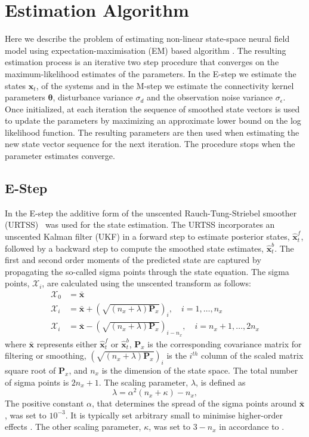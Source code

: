 \documentclass[]{article}
\begin{document}
\section{Estimation Algorithm}
Here we describe the problem of estimating non-linear state-space neural field model using expectation-maximisation (EM) based algorithm \cite{Shumway2000}. The resulting estimation process is an iterative two step procedure that converges on the maximum-likelihood estimates of the parameters. In the E-step we estimate the states $\mathbf x_t$, of the systems and in the M-step we estimate the connectivity kernel parameters $\boldsymbol \theta$, disturbance variance $\sigma_d$ and the observation noise variance $\sigma_{\epsilon}$. Once initialized, at each iteration the sequence of smoothed state vectors is used to update the parameters by maximizing an approximate lower bound on the log likelihood function. The resulting parameters are then used when estimating the new
state vector sequence for the next iteration. The procedure stops when the parameter estimates converge.
\subsection{E-Step}
In the E-step the additive form of the unscented Rauch-Tung-Striebel smoother (URTSS)~\cite{Sarkka2010} was used for the state estimation. The URTSS incorporates an unscented Kalman filter (UKF) \cite{Julier1997, Merwe2003} in a forward step to estimate posterior states, $\hat{\mathbf x}_t^{f}$, followed by a backward step to compute the smoothed state estimates, $\hat{\mathbf x}_t^{b}$. The first and second order moments of the predicted state are captured by propagating the so-called sigma points through the state equation. The sigma points, $\mathcal X_i$, are calculated using the unscented transform as follows:
\begin{align}\label{eq:sigmapoints1}
	\mathcal X_{0}&=\mathbf{\bar x} \\
	\mathcal X_{i}&= \mathbf{\bar x}+\left(\sqrt{( n_x + \lambda)\mathbf P_x}\right)_i, \quad i=1, \dots, n_x \\
	\mathcal X_{i}&=\mathbf{\bar x}-\left(\sqrt{( n_x + \lambda)\mathbf P_x}\right)_{i- n_x}, \quad i= n_x+1, \dots, 2n_x 
\end{align}
where $\mathbf{\bar x}$ represents either $\hat{\mathbf x}_t^{f}$ or $\hat{\mathbf x}_t^{b}$, $\mathbf{P}_x$ is the corresponding covariance matrix for filtering or smoothing, $\left(\sqrt{( n_x + \lambda)\mathbf P_x}\right)_i$ is the $i^{th}$ column of the scaled matrix square root of $\mathbf P_x$, and $n_x$ is the dimension of the state space. The total number of sigma points is $2n_x+1$. The scaling parameter, $\lambda$, is defined as 
\begin{equation}\label{eq:sigmapoints3}
	\lambda=\alpha^2( n_x+\kappa) - n_x, 
\end{equation}
The positive constant $\alpha$, that determines the spread of the sigma points around $\mathbf{\bar x}$, was set to $10^{-3}$. It is typically set arbitrary small to minimise higher-order effects \cite{Haykin2001}. The other scaling parameter, $\kappa$, was set to $3-n_x$ in accordance to \cite{Julier2002a}.
\end{document}
